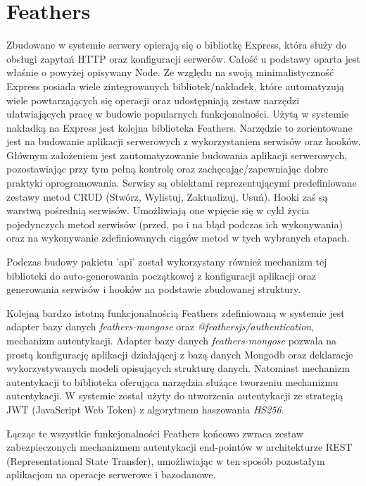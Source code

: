 \section{Feathers}
Zbudowane w systemie serwery opierają się o bibliotkę Express, która służy do obsługi zapytań HTTP oraz konfiguracji serwerów. Całość u podstawy oparta jest właśnie o powyżej opisywany Node. Ze względu na swoją minimalistyczność Express posiada wiele zintegrowanych bibliotek/nakładek, które automatyzują wiele powtarzających się operacji oraz udostępniają zestaw narzędzi ułatwiających pracę w budowie popularnych funkcjonalności. Użytą w systemie nakładką na Express jest kolejna biblioteka Feathers. Narzędzie to zorientowane jest na budowanie aplikacji serwerowych z wykorzystaniem serwisów oraz hooków. Głównym założeniem jest zautomatyzowanie budowania aplikacji serwerowych, pozostawiając przy tym pełną kontrolę oraz zachęcając/zapewniając dobre praktyki oprogramowania. Serwisy są obiektami reprezentującymi predefiniowane zestawy metod CRUD (Stwórz, Wylistuj, Zaktualizuj, Usuń). Hooki zaś są warstwą pośrednią serwisów. Umożliwiają one wpięcie się w cykl życia pojedynczych metod serwisów (przed, po i na błąd podczas ich wykonywania) oraz na wykonywanie zdefiniowanych ciągów metod w tych wybranych etapach. \cite{FeathersDocs}

Podczas budowy pakietu 'api' został wykorzystany również mechanizm tej biblioteki do auto-generowania początkowej z  konfiguracji aplikacji oraz generowania serwisów i hooków na podstawie zbudowanej struktury.

Kolejną bardzo istotną funkcjonalnością Feathers zdefiniowaną w systemie jest adapter bazy danych \textit{feathers-mongose} oraz \textit{@feathersjs/authentication}, mechanizm autentykacji. Adapter bazy danych \textit{feathers-mongose} pozwala na prostą konfigurację aplikacji działającej z bazą danych Mongodb oraz deklaracje wykorzystywanych modeli opisujących strukturę danych. Natomiast mechanizm autentykacji to biblioteka oferująca narzędzia służące tworzeniu mechanizmu autentykacji. W systemie został użyty do utworzenia autentykacji ze strategią JWT (JavaScript Web Token) z algorytmem haszowania \textit{HS256}. 

Łącząc te wszystkie funkcjonalności Feathers końcowo zwraca zestaw zabezpieczonych mechanizmem autentykacji end-pointów w architekturze REST (Representational State Transfer), umożliwiając w ten sposób pozostałym aplikacjom na operacje serwerowe i bazodanowe.

